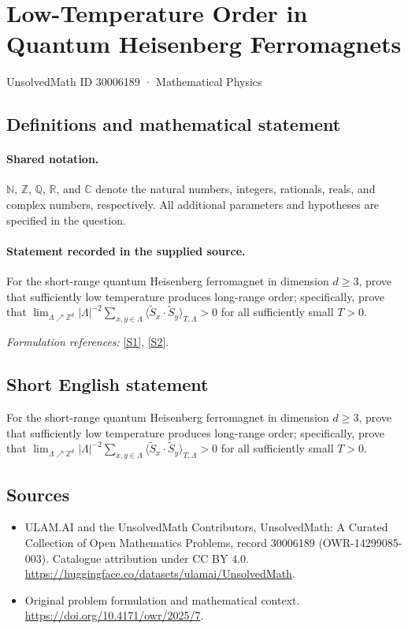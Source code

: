 \documentclass[11pt]{article}
\newcommand{\sref}[2]{\hyperlink{source:#1:#2}{[S#2]}}
\begin{document}
\setcounter{section}{30006188}
\section{Low-Temperature Order in Quantum Heisenberg Ferromagnets}\label{30006189}
{\small UnsolvedMath ID 30006189 · Mathematical Physics}
\subsection{Definitions and mathematical statement}

\paragraph{Shared notation.}$\mathbb N$, $\mathbb Z$, $\mathbb Q$, $\mathbb R$, and $\mathbb C$ denote the natural numbers, integers, rationals, reals, and complex numbers, respectively. All additional parameters and hypotheses are specified in the question.


\paragraph{Statement recorded in the supplied source.}
For the short-range quantum Heisenberg ferromagnet in dimension $d\geq 3$, prove that sufficiently low temperature produces long-range order; specifically, prove that $\lim_{\Lambda\nearrow\mathbb{Z}^d}|\Lambda|^{-2}\sum_{x,y\in\Lambda}\langle\widetilde S_x\cdot\widetilde S_y\rangle_{T,\Lambda}>0$ for all sufficiently small $T>0$.
\par\smallskip\textit{Formulation references:} \sref{30006189}{1}, \sref{30006189}{2}.
\subsection{Short English statement}
For the short-range quantum Heisenberg ferromagnet in dimension $d\geq 3$, prove that sufficiently low temperature produces long-range order; specifically, prove that $\lim_{\Lambda\nearrow\mathbb{Z}^d}|\Lambda|^{-2}\sum_{x,y\in\Lambda}\langle\widetilde S_x\cdot\widetilde S_y\rangle_{T,\Lambda}>0$ for all sufficiently small $T>0$.
\subsection{Sources}
\begin{itemize}
\item[\hypertarget{source:30006189:1}{S1}] ULAM.AI and the UnsolvedMath Contributors, UnsolvedMath: A Curated Collection of Open Mathematics Problems, record 30006189 (OWR-14299085-003). Catalogue attribution under CC BY 4.0.
\url{https://huggingface.co/datasets/ulamai/UnsolvedMath}.
\item[\hypertarget{source:30006189:2}{S2}] Original problem formulation and mathematical context.
\url{https://doi.org/10.4171/owr/2025/7}.
\end{itemize}
\label{end:30006189}
\end{document}
